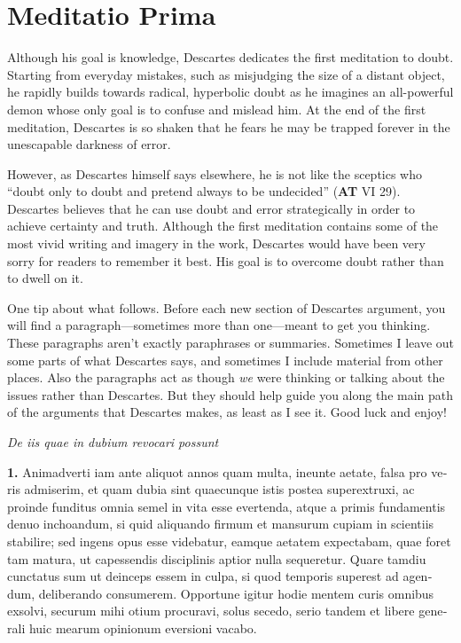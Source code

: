 \chapter{Meditatio Prima}


Although his goal is knowledge, Descartes dedicates the first meditation to doubt. Starting from everyday mistakes, such as misjudging the size of a distant object, he rapidly builds towards radical, hyperbolic doubt as he imagines an all-powerful demon whose only goal is to confuse and mislead him. At the end of the first meditation, Descartes is so shaken that he fears he may be trapped forever in the unescapable darkness of error.

However, as Descartes himself says elsewhere, he is not like the sceptics who ``doubt only to doubt and pretend always to be undecided'' (\textbf{AT} VI 29). Descartes believes that he can use doubt and error strategically in order to achieve certainty and truth. Although the first meditation contains some of the most vivid writing and imagery in the work, Descartes would have been very sorry for readers to remember it best. His goal is to overcome doubt rather than to dwell on it.

One tip about what follows. Before each new section of Descartes argument, you will find a paragraph---sometimes more than one---meant to get you thinking. These paragraphs aren't exactly paraphrases or summaries. Sometimes I leave out some parts of what Descartes says, and sometimes I include material from other places. Also the paragraphs act as though \textit{we} were thinking or talking about the issues rather than Descartes. But they should help guide you along the main path of the arguments that Descartes makes, as least as I see it. Good luck and enjoy!

\clearpage

\begin{center}
    \beginnumbering
    \numberlinefalse
    \pstart
    \textit{De iis quae in dubium revocari possunt}
    \pend
    \endnumbering
\end{center}

\beginnumbering
\pstart
\begin{latin}
    \textenglish{\textbf{1.}} Animadverti iam ante aliquot annos quam multa, ineunte aetate, falsa pro veris admiserim, et quam dubia sint quaecunque istis postea superextruxi, ac proinde funditus omnia semel in vita esse evertenda, atque a primis fundamentis denuo inchoandum, si quid aliquando firmum et mansurum cupiam in scientiis stabilire; sed ingens opus esse videbatur, eamque aetatem expectabam, quae foret tam matura, ut capessendis disciplinis aptior nulla sequeretur. Quare tamdiu cunctatus sum ut deinceps essem in culpa, si quod temporis superest ad agendum, deliberando consumerem. Opportune igitur hodie mentem curis omnibus exsolvi, securum mihi otium procuravi, solus secedo, serio tandem et libere generali huic mearum opinionum eversioni vacabo.
\end{latin}
\pend
\endnumbering

